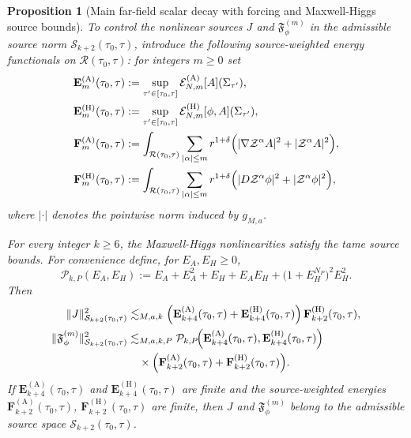\documentclass[11pt]{article}
\numberwithin{equation}{section}
\theoremstyle{plain}
\newtheorem{proposition}[theorem]{Proposition}
\theoremstyle{definition}
\theoremstyle{remark}
\begin{document}
\begin{proposition}[Main far-field scalar decay with forcing and Maxwell-Higgs source bounds]
\smallskip
To control the nonlinear sources $J$ and $\mathfrak{F}_{\phi}^{(m)}$ in the admissible source norm $\mathcal S_{k+2}(\tau_{0},\tau)$, introduce the following \emph{source-weighted energy functionals} on $\mathcal R(\tau_{0},\tau)$: for integers $m\ge0$ set
\begin{eqnarray}
\mathbf E_{m}^{(\mathrm A)}(\tau_{0},\tau)
&:= \sup_{\tau'\in[\tau_{0},\tau]}\mathcal E_{N,m}^{(\mathrm A)}[A](\Sigma_{\tau'}),
\label{eq:def-slab-energy-A}\\
\mathbf E_{m}^{(\mathrm H)}(\tau_{0},\tau)
&:= \sup_{\tau'\in[\tau_{0},\tau]}\mathcal E_{N,m}^{(\mathrm H)}[\phi,A](\Sigma_{\tau'}),
\label{eq:def-slab-energy-H}\\
\mathbf F_{m}^{(\mathrm A)}(\tau_{0},\tau)
&:= \int_{\mathcal R(\tau_{0},\tau)}\sum_{|\alpha|\le m} r^{1+\delta}\Bigl(|\nabla\mathcal Z^\alpha A|^{2}+|\mathcal Z^\alpha A|^{2}\Bigr),
\label{eq:def-source-weighted-energy-A}\\
\mathbf F_{m}^{(\mathrm H)}(\tau_{0},\tau)
&:= \int_{\mathcal R(\tau_{0},\tau)}\sum_{|\alpha|\le m} r^{1+\delta}\Bigl(|D\mathcal Z^\alpha\phi|^{2}+|\mathcal Z^\alpha\phi|^{2}\Bigr),
\label{eq:def-source-weighted-energy-H}
\end{eqnarray}
where $|\cdot|$ denotes the pointwise norm induced by $g_{M,a}$.

For every integer $k\ge6$, the Maxwell-Higgs nonlinearities satisfy the tame source bounds.
For convenience define, for $E_A,E_H\ge0$,
\begin{equation}\label{eq:def-tame-poly}
\mathcal P_{k,P}(E_A,E_H)
:=E_A+E_A^{2}+E_H+E_AE_H+\bigl(1+E_H^{N_P}\bigr)^{2}E_H^{2}.
\end{equation}
Then
\begin{eqnarray}
\|J\|_{\mathcal S_{k+2}(\tau_{0},\tau)}^{2}
&\lesssim_{M,a,k}
\Bigl(\mathbf E_{k+4}^{(\mathrm A)}(\tau_{0},\tau)+\mathbf E_{k+4}^{(\mathrm H)}(\tau_{0},\tau)\Bigr)\,
\mathbf F_{k+2}^{(\mathrm H)}(\tau_{0},\tau),
\label{eq:kerr-J-source-bound}\\
\|\mathfrak{F}_{\phi}^{(m)}\|_{\mathcal S_{k+2}(\tau_{0},\tau)}^{2}
&\lesssim_{M,a,k,P}
\mathcal P_{k,P}\!\Bigl(
\mathbf E_{k+4}^{(\mathrm A)}(\tau_{0},\tau),
\mathbf E_{k+4}^{(\mathrm H)}(\tau_{0},\tau)
\Bigr)\nonumber\\
&\quad\times
\Bigl(\mathbf F_{k+2}^{(\mathrm A)}(\tau_{0},\tau)+\mathbf F_{k+2}^{(\mathrm H)}(\tau_{0},\tau)\Bigr).
\label{eq:kerr-higgs-source-bound}
\end{eqnarray}
If $\mathbf E_{k+4}^{(\mathrm A)}(\tau_{0},\tau)$ and $\mathbf E_{k+4}^{(\mathrm H)}(\tau_{0},\tau)$ are finite and the source-weighted energies $\mathbf F_{k+2}^{(\mathrm A)}(\tau_{0},\tau)$, $\mathbf F_{k+2}^{(\mathrm H)}(\tau_{0},\tau)$ are finite, then $J$ and $\mathfrak{F}_{\phi}^{(m)}$ belong to the admissible source space $\mathcal S_{k+2}(\tau_{0},\tau)$.
\end{proposition}
\end{document}
